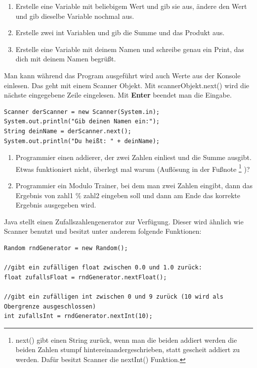 \documentclass{../../sheet}
\begin{document}
\begin{enumerate}
\begin{ausgabe}
....................@@@@@@@@@@\#................@@@:..........................
.....................@@@@@@@@...................@@@..........................
.............................................................................
    \end{ausgabe}
    \item Erstelle eine Variable mit beliebigem Wert und gib sie aus, ändere den Wert und gib dieselbe Variable nochmal aus.
    \item Erstelle zwei int Variablen und gib die Summe und das Produkt aus.
    \item Erstelle eine Variable mit deinem Namen und schreibe genau ein Print, das dich mit deinem Namen begrüßt.
\end{enumerate}

\newpage
{}
Man kann während das Program ausgeführt wird auch Werte aus der Konsole einlesen. Das geht mit einem Scanner Objekt. Mit scannerObjekt.next() wird die nächste eingegebene Zeile eingelesen. Mit \textbf{Enter} beendet man die Eingabe.  
\begin{verbatim}
Scanner derScanner = new Scanner(System.in);
System.out.println("Gib deinen Namen ein:");
String deinName = derScanner.next();
System.out.println("Du heißt: " + deinName);
\end{verbatim}

\begin{enumerate}
    \item Programmier einen addierer, der zwei Zahlen einliest und die Summe ausgibt. Etwas funktioniert nicht, überlegt mal warum (Auflösung in der Fußnote
    \footnote{
        next() gibt einen String zurück, wenn man die beiden addiert werden die beiden Zahlen stumpf hintereinandergeschrieben, statt gescheit addiert zu werden. Dafür besitzt Scanner die nextInt() Funktion.
    }
    )?
    \item Programmier ein Modulo Trainer, bei dem man zwei Zahlen eingibt, dann das Ergebnis von zahl1 \% zahl2 eingeben soll und dann am Ende das korrekte Ergebnis ausgegeben wird.
\end{enumerate}

\newpage
{}
Java stellt einen Zufallszahlengenerator zur Verfügung. Dieser wird ähnlich wie Scanner benutzt und besitzt unter anderem folgende Funktionen:

\begin{verbatim}
Random rndGenerator = new Random();

//gibt ein zufälligen float zwischen 0.0 und 1.0 zurück:
float zufallsFloat = rndGenerator.nextFloat();

//gibt ein zufälligen int zwischen 0 und 9 zurück (10 wird als Obergrenze ausgeschlossen)
int zufallsInt = rndGenerator.nextInt(10);
\end{verbatim}
\end{document}
